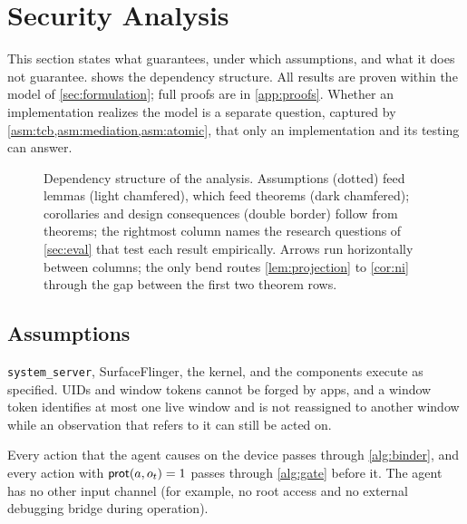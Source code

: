 \section{Security Analysis}\label{sec:theory}

This section states what \PG{} guarantees, under which assumptions, and what it does not guarantee.  shows the dependency structure. All results are proven within the model of \cref{sec:formulation}; full proofs are in \cref{app:proofs}. Whether an implementation realizes the model is a separate question, captured by \cref{asm:tcb,asm:mediation,asm:atomic}, that only an implementation and its testing can answer.

\begin{figure}[t]
  \centering
  
  \caption{Dependency structure of the analysis. Assumptions (dotted) feed lemmas (light chamfered), which feed theorems (dark chamfered); corollaries and design consequences (double border) follow from theorems; the rightmost column names the research questions of \cref{sec:eval} that test each result empirically. Arrows run horizontally between columns; the only bend routes \cref{lem:projection} to \cref{cor:ni} through the gap between the first two theorem rows.}
  \label{fig:theory}
\end{figure}

\subsection{Assumptions}

\begin{assumption}\label{asm:tcb}
\texttt{system\_server}, SurfaceFlinger, the kernel, and the \PG{} components execute as specified. UIDs and window tokens cannot be forged by apps, and a window token identifies at most one live window and is not reassigned to another window while an observation that refers to it can still be acted on.
\end{assumption}

\begin{assumption}\label{asm:mediation}
Every action that the agent causes on the device passes through \cref{alg:binder}, and every action with $\mathsf{prot}(a,o_t)=1$ passes through \cref{alg:gate} before it. The agent has no other input channel (for example, no root access and no external debugging bridge during operation).
\end{assumption}

